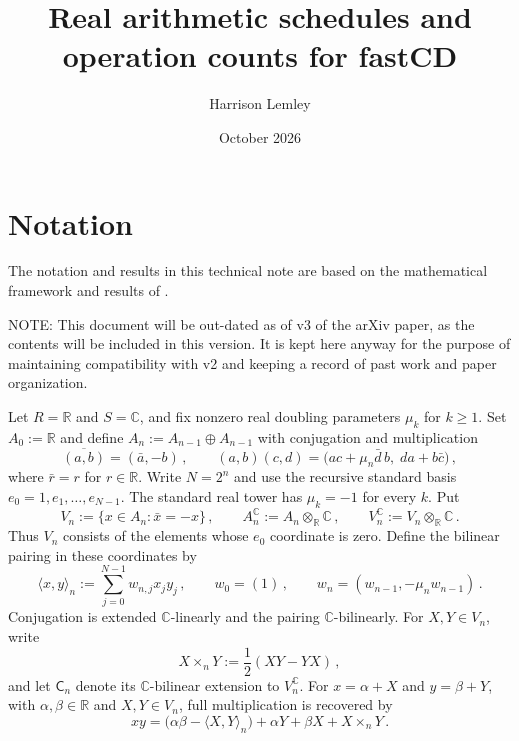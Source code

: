 \documentclass[11pt,reqno]{amsart}
\title[Real arithmetic schedules for fastCD]{Real arithmetic schedules
and operation counts for fastCD}
\author{Harrison Lemley}
\date{October 2026}
\numberwithin{equation}{section}
\newcommand{\R}{\mathbb R}
\newcommand{\C}{\mathbb C}
\newcommand{\AltC}{\mathsf C}
\begin{document}
\maketitle

\section{Notation}
\label{sec:notation}

The notation and results in this technical note are based on the mathematical
framework and results of
\cite{Lemley2026}.

NOTE: This document will be out-dated as of v3 of the arXiv paper, as the contents
will be included in this version. It is kept here anyway for the purpose of maintaining
compatibility with v2 and keeping a record of past work and paper organization.

Let $R=\R$ and $S=\C$, and fix nonzero real doubling parameters
$\mu_k$ for $k\ge1$. Set $A_0:=\R$ and define
$A_n:=A_{n-1}\oplus A_{n-1}$ with conjugation and multiplication
\begin{equation}\label{eq:CD-product}
\overline{(a,b)}=(\bar a,-b)\,,\qquad
(a,b)(c,d)=\bigl(ac+\mu_n\bar d\,b,\;da+b\bar c\bigr)\,,
\end{equation}
where $\bar r=r$ for $r\in\R$. Write $N=2^n$ and use the recursive
standard basis $e_0=1,e_1,\ldots,e_{N-1}$. The standard real tower has
$\mu_k=-1$ for every $k$. Put
\[
V_n:=\{x\in A_n:\bar x=-x\}\,,\qquad
A_n^{\C}:=A_n\otimes_{\R}\C\,,\qquad
V_n^{\C}:=V_n\otimes_{\R}\C\,.
\]
Thus $V_n$ consists of the elements whose $e_0$ coordinate is zero.
Define the bilinear pairing in these coordinates by
\begin{equation}\label{eq:weights}
\langle x,y\rangle_n:=\sum_{j=0}^{N-1}w_{n,j}x_jy_j\,,\qquad
w_0=(1)\,,\qquad w_n=(w_{n-1},-\mu_n w_{n-1})\,.
\end{equation}
Conjugation is extended $\C$-linearly and the pairing $\C$-bilinearly.
For $X,Y\in V_n$, write
\[
X\times_nY:=\frac12(XY-YX)\,,
\]
and let $\AltC_n$ denote its $\C$-bilinear extension to $V_n^{\C}$.
For $x=\alpha+X$ and $y=\beta+Y$, with $\alpha,\beta\in\R$ and
$X,Y\in V_n$, full multiplication is recovered by
\begin{equation}\label{eq:scalar--imaginary}
xy=\bigl(\alpha\beta-\langle X,Y\rangle_n\bigr)
   +\alpha Y+\beta X+X\times_nY\,.
\end{equation}
\end{document}
